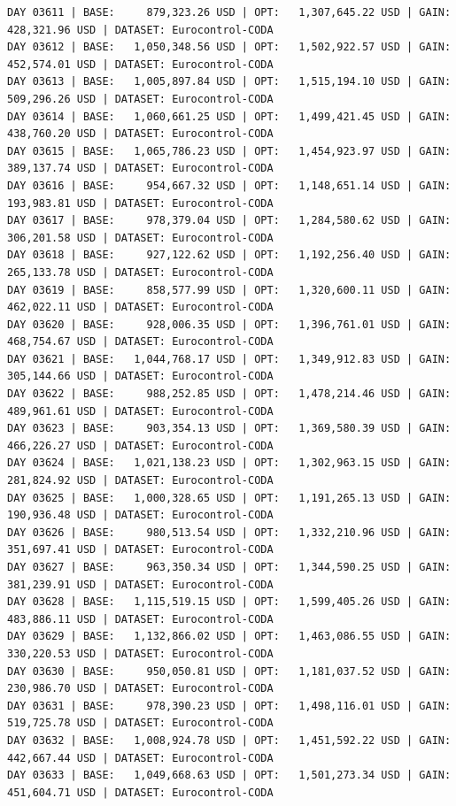 \documentclass[11pt,a4paper]{article}
\begin{document}
\begin{verbatim}
DAY 03611 | BASE:     879,323.26 USD | OPT:   1,307,645.22 USD | GAIN: 428,321.96 USD | DATASET: Eurocontrol-CODA
DAY 03612 | BASE:   1,050,348.56 USD | OPT:   1,502,922.57 USD | GAIN: 452,574.01 USD | DATASET: Eurocontrol-CODA
DAY 03613 | BASE:   1,005,897.84 USD | OPT:   1,515,194.10 USD | GAIN: 509,296.26 USD | DATASET: Eurocontrol-CODA
DAY 03614 | BASE:   1,060,661.25 USD | OPT:   1,499,421.45 USD | GAIN: 438,760.20 USD | DATASET: Eurocontrol-CODA
DAY 03615 | BASE:   1,065,786.23 USD | OPT:   1,454,923.97 USD | GAIN: 389,137.74 USD | DATASET: Eurocontrol-CODA
DAY 03616 | BASE:     954,667.32 USD | OPT:   1,148,651.14 USD | GAIN: 193,983.81 USD | DATASET: Eurocontrol-CODA
DAY 03617 | BASE:     978,379.04 USD | OPT:   1,284,580.62 USD | GAIN: 306,201.58 USD | DATASET: Eurocontrol-CODA
DAY 03618 | BASE:     927,122.62 USD | OPT:   1,192,256.40 USD | GAIN: 265,133.78 USD | DATASET: Eurocontrol-CODA
DAY 03619 | BASE:     858,577.99 USD | OPT:   1,320,600.11 USD | GAIN: 462,022.11 USD | DATASET: Eurocontrol-CODA
DAY 03620 | BASE:     928,006.35 USD | OPT:   1,396,761.01 USD | GAIN: 468,754.67 USD | DATASET: Eurocontrol-CODA
DAY 03621 | BASE:   1,044,768.17 USD | OPT:   1,349,912.83 USD | GAIN: 305,144.66 USD | DATASET: Eurocontrol-CODA
DAY 03622 | BASE:     988,252.85 USD | OPT:   1,478,214.46 USD | GAIN: 489,961.61 USD | DATASET: Eurocontrol-CODA
DAY 03623 | BASE:     903,354.13 USD | OPT:   1,369,580.39 USD | GAIN: 466,226.27 USD | DATASET: Eurocontrol-CODA
DAY 03624 | BASE:   1,021,138.23 USD | OPT:   1,302,963.15 USD | GAIN: 281,824.92 USD | DATASET: Eurocontrol-CODA
DAY 03625 | BASE:   1,000,328.65 USD | OPT:   1,191,265.13 USD | GAIN: 190,936.48 USD | DATASET: Eurocontrol-CODA
DAY 03626 | BASE:     980,513.54 USD | OPT:   1,332,210.96 USD | GAIN: 351,697.41 USD | DATASET: Eurocontrol-CODA
DAY 03627 | BASE:     963,350.34 USD | OPT:   1,344,590.25 USD | GAIN: 381,239.91 USD | DATASET: Eurocontrol-CODA
DAY 03628 | BASE:   1,115,519.15 USD | OPT:   1,599,405.26 USD | GAIN: 483,886.11 USD | DATASET: Eurocontrol-CODA
DAY 03629 | BASE:   1,132,866.02 USD | OPT:   1,463,086.55 USD | GAIN: 330,220.53 USD | DATASET: Eurocontrol-CODA
DAY 03630 | BASE:     950,050.81 USD | OPT:   1,181,037.52 USD | GAIN: 230,986.70 USD | DATASET: Eurocontrol-CODA
DAY 03631 | BASE:     978,390.23 USD | OPT:   1,498,116.01 USD | GAIN: 519,725.78 USD | DATASET: Eurocontrol-CODA
DAY 03632 | BASE:   1,008,924.78 USD | OPT:   1,451,592.22 USD | GAIN: 442,667.44 USD | DATASET: Eurocontrol-CODA
DAY 03633 | BASE:   1,049,668.63 USD | OPT:   1,501,273.34 USD | GAIN: 451,604.71 USD | DATASET: Eurocontrol-CODA

\end{verbatim}
\end{document}
